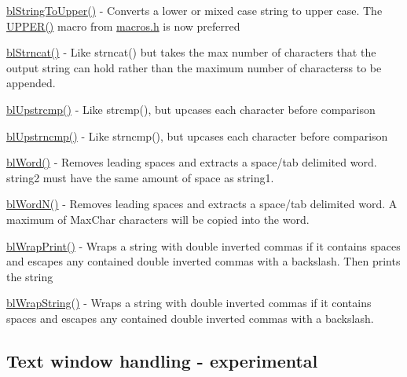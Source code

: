 \begin{DoxyItemize}
\item \hyperlink{general_8h_aedf1772a9e444145f5f692f8d7827015}{bl\-String\-To\-Upper()} -\/ Converts a lower or mixed case string to upper case. The \hyperlink{macros_8h_a8ce7aa85856d9abe74e8f6080cd97740}{U\-P\-P\-E\-R()} macro from \hyperlink{macros_8h}{macros.\-h} is now preferred
\item \hyperlink{general_8h_a6b5045229f8ad05a80f24126203cc2d8}{bl\-Strncat()} -\/ Like strncat() but takes the max number of characters that the output string can hold rather than the maximum number of characterss to be appended.
\item \hyperlink{general_8h_ab7da15f8d8ceef1b0f8d599c22eb5469}{bl\-Upstrcmp()} -\/ Like strcmp(), but upcases each character before comparison
\item \hyperlink{general_8h_a6408a18d4fe862bb0c2051de495b2456}{bl\-Upstrncmp()} -\/ Like strncmp(), but upcases each character before comparison
\item \hyperlink{general_8h_a38df4250c9dac963202207bd6e37f204}{bl\-Word()} -\/ Removes leading spaces and extracts a space/tab delimited word. string2 must have the same amount of space as string1.
\item \hyperlink{general_8h_a6a91862f4f4ccfc0f6a73631c0aa5726}{bl\-Word\-N()} -\/ Removes leading spaces and extracts a space/tab delimited word. A maximum of Max\-Char characters will be copied into the word.
\item \hyperlink{general_8h_af558d2efeb2ba23931396882d32f3fe9}{bl\-Wrap\-Print()} -\/ Wraps a string with double inverted commas if it contains spaces and escapes any contained double inverted commas with a backslash. Then prints the string
\item \hyperlink{general_8h_acccb9091b4202013b48322965cb19dcf}{bl\-Wrap\-String()} -\/ Wraps a string with double inverted commas if it contains spaces and escapes any contained double inverted commas with a backslash.
\end{DoxyItemize}

\subsection*{Text window handling -\/ experimental }


